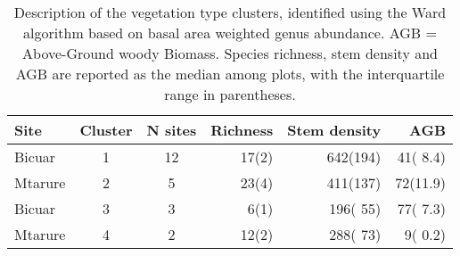 \begin{table}[]
\centering
\caption{Description of the vegetation type clusters, identified using the Ward algorithm based on basal area weighted genus abundance. AGB = Above-Ground woody Biomass. Species richness, stem density and AGB are reported as the median among plots, with the interquartile range in parentheses.} 
\label{clust_summ}
\begin{tabular}{lcS[table-format=2.0]rrr}
  \toprule
{Site} & {Cluster} & {N sites} & {Richness} & {Stem density} & {AGB} \\ 
  \midrule
Bicuar & 1 & 12 & 17(2) & 642(194) & 41( 8.4) \\ 
  Mtarure & 2 & 5 & 23(4) & 411(137) & 72(11.9) \\ 
  Bicuar & 3 & 3 &  6(1) & 196( 55) & 77( 7.3) \\ 
  Mtarure & 4 & 2 & 12(2) & 288( 73) &  9( 0.2) \\ 
   \bottomrule
\end{tabular}
\end{table}

